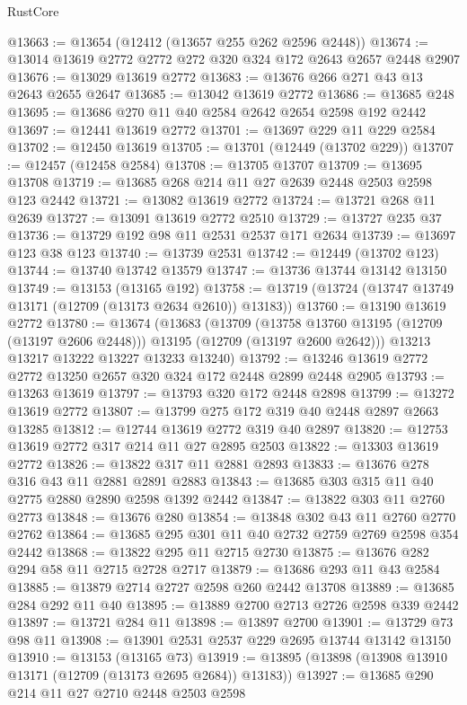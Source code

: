 \begin{lexlean}{RustCore}
\begin{coremodule}
@13663 := @13654 (@12412 (@13657 @255 @262 @2596 @2448))
@13674 := @13014 @13619 @2772 @2772 @272 @320 @324 @172 @2643 @2657 @2448 @2907
@13676 := @13029 @13619 @2772
@13683 := @13676 @266 @271 @43 @13 @2643 @2655 @2647
@13685 := @13042 @13619 @2772
@13686 := @13685 @248
@13695 := @13686 @270 @11 @40 @2584 @2642 @2654 @2598 @192 @2442
@13697 := @12441 @13619 @2772
@13701 := @13697 @229 @11 @229 @2584
@13702 := @12450 @13619
@13705 := @13701 (@12449 (@13702 @229))
@13707 := @12457 (@12458 @2584)
@13708 := @13705 @13707
@13709 := @13695 @13708
@13719 := @13685 @268 @214 @11 @27 @2639 @2448 @2503 @2598 @123 @2442
@13721 := @13082 @13619 @2772
@13724 := @13721 @268 @11 @2639
@13727 := @13091 @13619 @2772 @2510
@13729 := @13727 @235 @37
@13736 := @13729 @192 @98 @11 @2531 @2537 @171 @2634
@13739 := @13697 @123 @38 @123
@13740 := @13739 @2531
@13742 := @12449 (@13702 @123)
@13744 := @13740 @13742 @13579
@13747 := @13736 @13744 @13142 @13150
@13749 := @13153 (@13165 @192)
@13758 := @13719 (@13724 (@13747 @13749 @13171 (@12709 (@13173 @2634 @2610)) @13183))
@13760 := @13190 @13619 @2772
@13780 := @13674
    (@13683
      (@13709
        (@13758 @13760 @13195 (@12709 (@13197 @2606 @2448)))
        @13195
        (@12709 (@13197 @2600 @2642)))
      @13213
      @13217
      @13222
      @13227
      @13233
      @13240)
@13792 := @13246 @13619 @2772 @2772 @13250 @2657 @320 @324 @172 @2448 @2899 @2448 @2905
@13793 := @13263 @13619
@13797 := @13793 @320 @172 @2448 @2898
@13799 := @13272 @13619 @2772
@13807 := @13799 @275 @172 @319 @40 @2448 @2897 @2663 @13285
@13812 := @12744 @13619 @2772 @319 @40 @2897
@13820 := @12753 @13619 @2772 @317 @214 @11 @27 @2895 @2503
@13822 := @13303 @13619 @2772
@13826 := @13822 @317 @11 @2881 @2893
@13833 := @13676 @278 @316 @43 @11 @2881 @2891 @2883
@13843 := @13685 @303 @315 @11 @40 @2775 @2880 @2890 @2598 @1392 @2442
@13847 := @13822 @303 @11 @2760 @2773
@13848 := @13676 @280
@13854 := @13848 @302 @43 @11 @2760 @2770 @2762
@13864 := @13685 @295 @301 @11 @40 @2732 @2759 @2769 @2598 @354 @2442
@13868 := @13822 @295 @11 @2715 @2730
@13875 := @13676 @282 @294 @58 @11 @2715 @2728 @2717
@13879 := @13686 @293 @11 @43 @2584
@13885 := @13879 @2714 @2727 @2598 @260 @2442 @13708
@13889 := @13685 @284 @292 @11 @40
@13895 := @13889 @2700 @2713 @2726 @2598 @339 @2442
@13897 := @13721 @284 @11
@13898 := @13897 @2700
@13901 := @13729 @73 @98 @11
@13908 := @13901 @2531 @2537 @229 @2695 @13744 @13142 @13150
@13910 := @13153 (@13165 @73)
@13919 := @13895 (@13898 (@13908 @13910 @13171 (@12709 (@13173 @2695 @2684)) @13183))
@13927 := @13685 @290 @214 @11 @27 @2710 @2448 @2503 @2598

\end{coremodule}
\end{lexlean}
